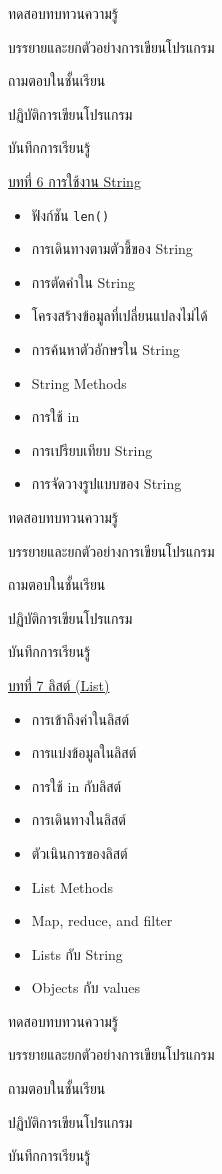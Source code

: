 {
\item ทดสอบทบทวนความรู้
\item  บรรยายและยกตัวอย่างการเขียนโปรแกรม
\item  ถามตอบในชั้นเรียน
\item  ปฏิบัติการเขียนโปรแกรม
\item  บันทึกการเรียนรู้
}
{
\underline{บทที่ 6 การใช้งาน String}
\begin{itemize}
\item ฟังก์ชัน \texttt{len()}
\item การเดินทางตามตัวชี้ของ String
\item การตัดคำใน String
\item โครงสร้างข้อมูลที่เปลี่ยนแปลงไม่ได้
\item การค้นหาตัวอักษรใน String
\item String Methods
\item การใช้ in
\item การเปรียบเทียบ String
\item การจัดวางรูปแบบของ String

\end{itemize}

}
{
\item ทดสอบทบทวนความรู้
\item  บรรยายและยกตัวอย่างการเขียนโปรแกรม
\item  ถามตอบในชั้นเรียน
\item  ปฏิบัติการเขียนโปรแกรม
\item  บันทึกการเรียนรู้
}
{
\underline{บทที่ 7 ลิสต์ (List)}
\begin{itemize}
\item การเข้าถึงค่าในลิสต์
\item การแบ่งข้อมูลในลิสต์
\item การใช้ in กับลิสต์
\item การเดินทางในลิสต์
\item ตัวเนินการของลิสต์
\item List Methods
\item Map, reduce, and filter
\item Lists กับ String
\item Objects กับ values
\end{itemize}
}
{
\item ทดสอบทบทวนความรู้
\item  บรรยายและยกตัวอย่างการเขียนโปรแกรม
\item  ถามตอบในชั้นเรียน
\item  ปฏิบัติการเขียนโปรแกรม
\item  บันทึกการเรียนรู้
}
